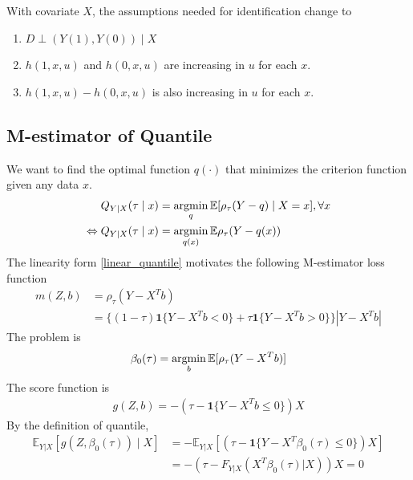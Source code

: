 \documentclass[11pt]{elegantbook}
\newcommand{\argmin}{\operatornamewithlimits{argmin}}
\begin{document}
With covariate $X$, the assumptions needed for identification change to
\begin{assumption}
    \begin{enumerate}[{A}1.]
        \item $D\perp (Y(1),Y(0)) \mid X$
        \item $h(1,x,u)$ and $h(0,x,u)$ are increasing in $u$ for each $x$.
        \item $h(1,x,u)-h(0,x,u)$ is also increasing in $u$ for each $x$.
    \end{enumerate}
\end{assumption}


\subsection{M-estimator of Quantile}
We want to find the optimal function $q(\cdot)$ that minimizes the criterion function given any data $x$.
\begin{equation}
    \begin{aligned}
        Q_{Y|X}(\tau\mid x)&=\argmin_{q} \mathbb{E}[\rho_\tau(Y-q)\mid X=x],\forall x\\
        \Leftrightarrow Q_{Y|X}(\tau\mid x)&=\argmin_{q(x)} \mathbb{E}\rho_\tau(Y-q(x))
    \end{aligned}
    \nonumber
\end{equation}
The linearity form \eqref{linear_quantile} motivates the following M-estimator loss function
\begin{equation}
    \begin{aligned}
        m(Z,b)&=\rho_\tau(Y-X^Tb)\\
        &=\{(1-\tau)\mathbf{1}\{Y-X^Tb<0\}+\tau\mathbf{1}\{Y-X^Tb>0\}\}|Y-X^Tb|
    \end{aligned}
    \nonumber
\end{equation}
The problem is
\begin{equation}
    \begin{aligned}
        \beta_0(\tau)=\argmin_b \mathbb{E}[\rho_\tau(Y-X^Tb)]
    \end{aligned}
    \nonumber
\end{equation}
The score function is
\begin{equation}
    \begin{aligned}
        g(Z,b)=-(\tau-\mathbf{1}\{Y-X^Tb\leq 0\})X
    \end{aligned}
    \nonumber
\end{equation}
By the definition of quantile,
\begin{equation}
    \begin{aligned}
        \mathbb{E}_{Y|X}[g(Z,\beta_0(\tau))\mid X]&=-\mathbb{E}_{Y|X}[(\tau-\mathbf{1}\{Y-X^T\beta_0(\tau)\leq 0\})X]\\
        &=-(\tau-F_{Y|X}(X^T\beta_0(\tau)|X))X=0
    \end{aligned}
    \nonumber
\end{equation}
\end{document}
